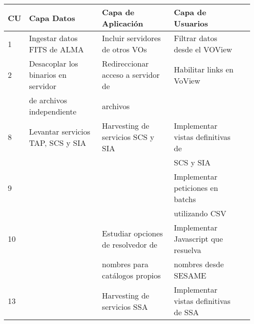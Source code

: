 \footnotesize
\begin{tabular}{|l|l|l|l|l|}
\hline
\footnotesize
\textbf{CU} & \textbf{Capa Datos} &
\textbf{Capa de Aplicación} & \textbf{Capa de Usuarios} \\
\hline
\hline
1 & 
Ingestar datos FITS de ALMA & 
Incluir servidores de otros VOs & 
Filtrar datos desde el VOView \\
\hline
2 & 
Desacoplar los binarios en servidor &
Redireccionar acceso a servidor de & 
Habilitar links en VoView \\
&
de archivos independiente &
archivos & \\
\hline
8 & 
Levantar servicios TAP, SCS y SIA & 
Harvesting de servicios SCS y SIA &
Implementar vistas definitivas de \\
& & &
SCS y SIA \\
\hline
9 & & & 
Implementar peticiones en batchs \\ 
& & & 
utilizando CSV \\
\hline
10 & & 
Estudiar opciones de resolvedor de &
Implementar Javascript que resuelva \\
& &
nombres para catálogos propios &
nombres desde SESAME \\
\hline
13 & & 
Harvesting de servicios SSA &
Implementar vistas definitivas de SSA \\ 
\hline
\end{tabular}

\normalsize


